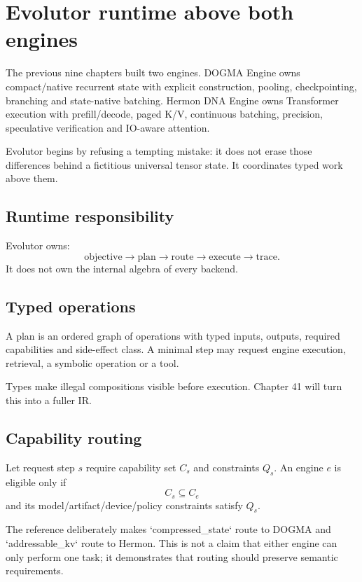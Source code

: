 \chapter{Evolutor runtime above both engines}

The previous nine chapters built two engines. DOGMA Engine owns compact/native recurrent state with explicit construction, pooling, checkpointing, branching and state-native batching. Hermon DNA Engine owns Transformer execution with prefill/decode, paged K/V, continuous batching, precision, speculative verification and IO-aware attention.

Evolutor begins by refusing a tempting mistake: it does not erase those differences behind a fictitious universal tensor state. It coordinates typed work above them.

\section{Runtime responsibility}
Evolutor owns:
\[
\text{objective}\rightarrow\text{plan}\rightarrow\text{route}\rightarrow\text{execute}\rightarrow\text{trace}.
\]
It does not own the internal algebra of every backend.

\section{Typed operations}
A plan is an ordered graph of operations with typed inputs, outputs, required capabilities and side-effect class. A minimal step may request engine execution, retrieval, a symbolic operation or a tool.

Types make illegal compositions visible before execution. Chapter 41 will turn this into a fuller IR.

\section{Capability routing}
Let request step $s$ require capability set $C_s$ and constraints $Q_s$. An engine $e$ is eligible only if
\[
C_s\subseteq C_e
\]
and its model/artifact/device/policy constraints satisfy $Q_s$.

The reference deliberately makes `compressed_state` route to DOGMA and `addressable_kv` route to Hermon. This is not a claim that either engine can only perform one task; it demonstrates that routing should preserve semantic requirements.


